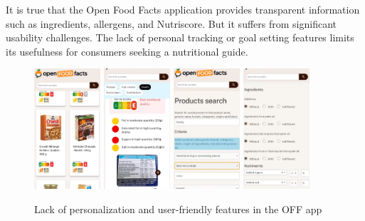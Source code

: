 It is true that the Open Food Facts application provides transparent
information such as ingredients, allergens, and Nutriscore. But it suffers
from significant usability challenges. The lack of personal tracking or goal
setting features limits its usefulness for consumers seeking a nutritional
guide.
\begin{figure}[H]
    \centering
    \includegraphics[width=0.22\textwidth]{images/OFF-00.png}
    \includegraphics[width=0.22\textwidth]{images/OFF-01.png}
    \includegraphics[width=0.22\textwidth]{images/OFF-02.png}
    \includegraphics[width=0.22\textwidth]{images/OFF-03.png}
    \caption{Lack of personalization and user-friendly features in the OFF app}
    \label{fig:natilait_screenshots}
\end{figure}

